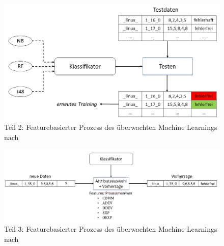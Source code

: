 \begin{figure}[H]
    \centering
    \includegraphics[width=\textwidth]{images/ML2}
    \caption{Teil 2: Featurebasierter Prozess des überwachten Machine Learnings nach \cite{Queiroz2016}}\label{fig:ml2}
\end{figure}

\begin{figure}[H]
    \centering
    \includegraphics[width=\textwidth]{images/ML3}
    \caption{Teil 3: Featurebasierter Prozess des überwachten Machine Learnings nach \cite{Queiroz2016}}\label{fig:ml3}
\end{figure}

\cleardoublepage
